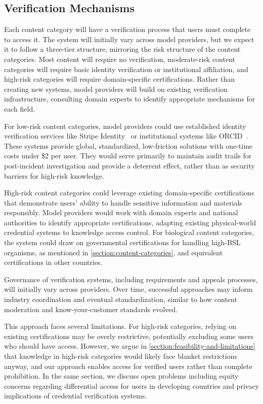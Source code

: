\documentclass{article}
\theoremstyle{plain}
\theoremstyle{definition}
\theoremstyle{remark}
\begin{document}
\subsection{Verification Mechanisms} \label{section:verification-mechanisms}

Each content category will have a verification process that users must complete to access it.
The system will initially vary across model providers, but we expect it to follow a three-tier structure, mirroring the risk structure of the content categories.
Most content will require no verification, moderate-risk content categories will require basic identity verification or institutional affiliation, and high-risk categories will require domain-specific certifications.
Rather than creating new systems, model providers will build on existing verification infrastructure, consulting domain experts to identify appropriate mechanisms for each field.

For low-risk content categories, model providers could use established identity verification services like Stripe Identity~\cite{stripe_identity_2024} or institutional systems like ORCID~\cite{orcid_2024}.
These systems provide global, standardized, low-friction solutions with one-time costs under \$2 per user.
They would serve primarily to maintain audit trails for post-incident investigation and provide a deterrent effect, rather than as security barriers for high-risk knowledge.

High-risk content categories could leverage existing domain-specific certifications that demonstrate users' ability to handle sensitive information and materials responsibly.
Model providers would work with domain experts and national authorities to identify appropriate certifications, adapting existing physical-world credential systems to knowledge access control.
For biological content categories, the system could draw on governmental certifications for handling high-BSL organisms, as mentioned in \cref{section:content-categories}, and equivalent certifications in other countries.

Governance of verification systems, including requirements and appeals processes, will initially vary across providers.
Over time, successful approaches may inform industry coordination and eventual standardization, similar to how content moderation and know-your-customer standards evolved.

This approach faces several limitations.
For high-risk categories, relying on existing certifications may be overly restrictive, potentially excluding some users who should have access.
However, we argue in \cref{section:feasibility-and-limitations} that knowledge in high-risk categories would likely face blanket restrictions anyway, and our approach enables access for verified users rather than complete prohibition.
In the same section, we discuss open problems including equity concerns regarding differential access for users in developing countries and privacy implications of credential verification systems.
\end{document}

